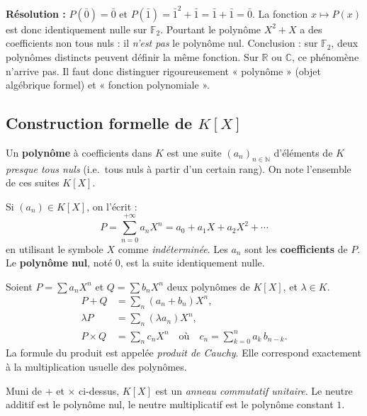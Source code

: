 \textbf{Résolution :} $P(\bar{0}) = \bar{0}$ et $P(\bar{1}) = \bar{1}^2 + \bar{1} = \bar{1} + \bar{1} = \bar{0}$. La fonction $x \mapsto P(x)$ est donc identiquement nulle sur $\mathbb{F}_2$. Pourtant le polynôme $X^2 + X$ a des coefficients non tous nuls : il \emph{n'est pas} le polynôme nul. Conclusion : sur $\mathbb{F}_2$, deux polynômes distincts peuvent définir la même fonction. Sur $\mathbb{R}$ ou $\mathbb{C}$, ce phénomène n'arrive pas. Il faut donc distinguer rigoureusement « polynôme » (objet algébrique formel) et « fonction polynomiale ».

\subsection{Construction formelle de $K[X]$}

\begin{definition}
Un \textbf{polynôme} à coefficients dans $K$ est une suite $(a_n)_{n \in \mathbb{N}}$ d'éléments de $K$ \emph{presque tous nuls} (i.e.\ tous nuls à partir d'un certain rang). On note l'ensemble de ces suites $K[X]$.

Si $(a_n) \in K[X]$, on l'écrit :
\[ P = \sum_{n=0}^{+\infty} a_n X^n = a_0 + a_1 X + a_2 X^2 + \cdots \]
en utilisant le symbole $X$ comme \emph{indéterminée}. Les $a_n$ sont les \textbf{coefficients} de $P$. Le \textbf{polynôme nul}, noté $0$, est la suite identiquement nulle.
\end{definition}

\begin{definition}
Soient $P = \sum a_n X^n$ et $Q = \sum b_n X^n$ deux polynômes de $K[X]$, et $\lambda \in K$.
\begin{align*}
P + Q &= \sum_{n} (a_n + b_n) X^n, \\
\lambda P &= \sum_{n} (\lambda a_n) X^n, \\
P \times Q &= \sum_{n} c_n X^n \quad \text{où} \quad c_n = \sum_{k=0}^{n} a_k\, b_{n-k}.
\end{align*}
La formule du produit est appelée \emph{produit de Cauchy}. Elle correspond exactement à la multiplication usuelle des polynômes.
\end{definition}

\begin{theoreme}
Muni de $+$ et $\times$ ci-dessus, $K[X]$ est un \emph{anneau commutatif unitaire}. Le neutre additif est le polynôme nul, le neutre multiplicatif est le polynôme constant $1$.
\end{theoreme}

